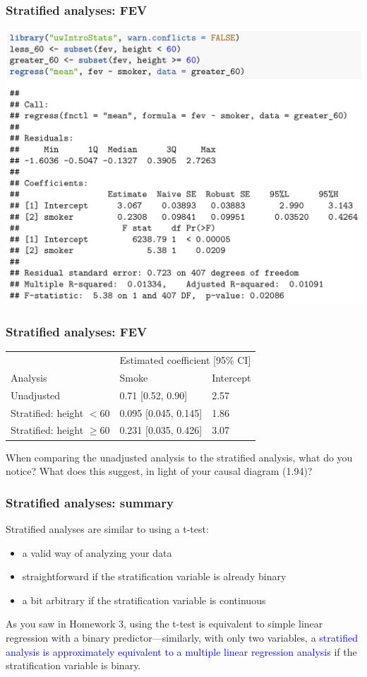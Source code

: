 \documentclass[12pt, 
hyperref={colorlinks=true, linkcolor=blue, urlcolor=cyan}]{beamer}
\begin{document}
\begin{frame}
\frametitle{Stratified analyses: FEV}

\includegraphics[width=1\textwidth]{plots/fev_vs_smoke_stratified_greater_60.png}

\end{frame}

\begin{frame}
\frametitle{Stratified analyses: FEV}
\vspace{-1cm}\hspace*{-0.75cm}\begin{tabular}{lll}
& \multicolumn{2}{c}{Estimated coefficient [95\% CI]} \\
Analysis & Smoke & Intercept \\
\hline
Unadjusted  & 0.71 [0.52, 0.90] & 2.57 \\
Stratified: height $< 60$ & 0.095 [0.045, 0.145] & 1.86\\
Stratified: height $\geq 60$ & 0.231 [0.035, 0.426] & 3.07
\end{tabular}

\vspace{1cm}
When comparing the unadjusted analysis to the stratified analysis, what do you notice? What does this suggest, in light of your causal diagram (1.94)?
\end{frame}

\begin{frame}
\frametitle{Stratified analyses: summary}
Stratified analyses are similar to using a t-test:
\begin{itemize}
\item a valid way of analyzing your data
\item straightforward if the stratification variable is already binary
\item a bit arbitrary if the stratification variable is continuous
\end{itemize}

As you saw in Homework 3, using the t-test is equivalent to simple linear regression with a binary predictor---similarly, with only two variables, a \textcolor{blue}{stratified analysis is approximately equivalent to a multiple linear regression analysis} if the stratification variable is binary. 
\end{frame}
\end{document}
